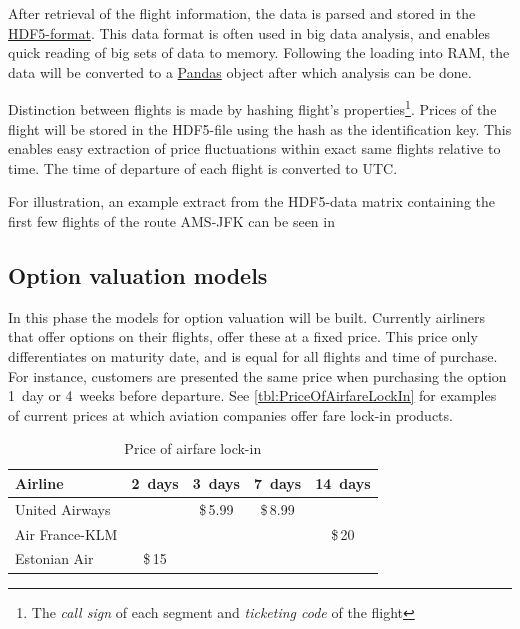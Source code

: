 After retrieval of the flight information, the data is parsed and stored in the \href{http://www.hdfgroup.org/HDF5/}{HDF5-format}. This data format is often used in big data analysis, and enables quick reading of big sets of data to memory. Following the loading into RAM, the data will be converted to a \href{http://pandas.pydata.org/}{Pandas} object after which analysis can be done.

Distinction between flights is made by hashing flight's  properties\footnote{The \emph{call sign} of each segment and \emph{ticketing code} of the flight}. Prices of the flight will be stored in the HDF5-file using the hash as the identification key. This enables easy extraction of price fluctuations within exact same flights relative to time. The time of departure of each flight is converted to UTC.

For illustration, an example extract from the HDF5-data matrix containing the first few flights of the route AMS-JFK can be seen in 


\subsection{Option valuation models}
\label{subsec:OptionValuationModels}


In this phase the models for option valuation will be built. Currently airliners that offer options on their flights, offer these at a fixed price. This price only differentiates on maturity date, and is equal for all flights and time of purchase. For instance, customers are presented the same price when purchasing the option 1~day or 4~weeks before departure. See \autoref{tbl:PriceOfAirfareLockIn} for examples of current prices at which aviation companies offer fare lock-in products.

\begin{table}[ht]
	\centering
	\begin{tabular}{l  c  c  c  c}
	\hline \hline
	Airline         & 2~days & 3~days  & 7~days  & 14~days \\ \hline
	United Airways  &        & \$\,5.99 & \$\,8.99 & 	       \\
	Air France-KLM  &        &         &         & \$\,20   \\
	Estonian Air    & \$\,15   &         &         &         \\
	\hline
	\end{tabular}
	\caption{Price of airfare lock-in}
	\label{tbl:PriceOfAirfareLockIn}
\end{table}

